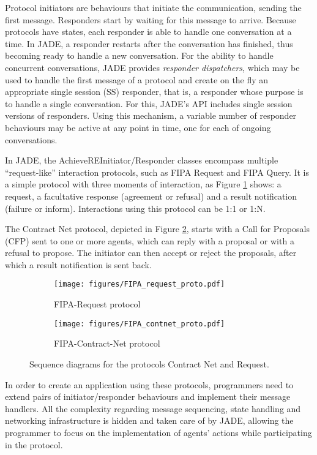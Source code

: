 Protocol initiators are behaviours that initiate the communication, sending the first message. Responders start by waiting for this message to arrive. Because protocols have states, each responder is able to handle one conversation at a time. In JADE, a responder restarts after the conversation has finished, thus becoming ready to handle a new conversation. For the ability to handle concurrent conversations, JADE provides \textit{responder dispatchers}, which may be used to handle the first message of a protocol and create on the fly an appropriate single session (SS) responder, that is, a responder whose purpose is to handle a single conversation. For this, JADE’s API includes single session versions of responders. Using this mechanism, a variable number of responder behaviours may be active at any point in time, one for each of ongoing conversations.

In JADE, the AchieveREInitiator/Responder classes encompass multiple “request-like” interaction protocols, such as FIPA Request and FIPA Query. It is a simple protocol with three moments of interaction, as Figure \ref{fig:FIPA_request_proto} shows: a request, a facultative response (agreement or refusal) and a result notification (failure or inform). Interactions using this protocol can be 1:1 or 1:N.

The Contract Net protocol, depicted in Figure \ref{fig:FIPA_contnet_proto}, starts with a Call for Proposals (CFP) sent to one or more agents, which can reply with a proposal or with a refusal to propose. The initiator can then accept or reject the proposals, after which a result notification is sent back.

\begin{figure}
	\centering
    \begin{subfigure}[b]{0.44\textwidth}
		\centering
		\texttt{[image: figures/FIPA\_request\_proto.pdf]}
		\caption[FIPA-Request protocol]{FIPA-Request protocol}
		\label{fig:FIPA_request_proto}
    \end{subfigure}%
    \begin{subfigure}[b]{0.54\textwidth}
		\centering
		\texttt{[image: figures/FIPA\_contnet\_proto.pdf]}
		\caption[FIPA-Contract-Net protocol]{FIPA-Contract-Net protocol}
		\label{fig:FIPA_contnet_proto}
    \end{subfigure}
    \caption[]{Sequence diagrams for the protocols Contract Net and Request.}
    \label{fig:FIPA_Protocols}
\end{figure}

In order to create an application using these protocols, programmers need to extend pairs of initiator/responder behaviours and implement their message handlers. All the complexity regarding message sequencing, state handling and networking infrastructure is hidden and taken care of by JADE, allowing the programmer to focus on the implementation of agents’ actions while participating in the protocol.
